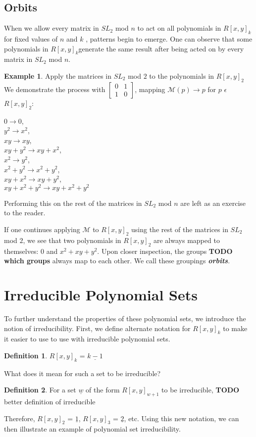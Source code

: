 \documentclass[a4paper,draft]{amsproc}
\theoremstyle{plain}
\theoremstyle{definition}
\newtheorem{exm}{Example}[section]
\newtheorem{dfn}{Definition}[section]
\theoremstyle{remark}
\numberwithin{equation}{section}
\begin{document}
\subsection{Orbits}
When we allow every matrix in $SL_{2}$ mod $n$ to act on all polynomials in $R[x,y]_{k}$for fixed values of $n$ and $k$ , patterns begin to emerge.
One can observe that some polynomials in $R[x,y]_{k}$generate the same result after being acted on by every matrix in $SL_{2}$ mod $n$. 
\begin{exm}
Apply the matrices in $SL_{2}$ mod $2$ to the polynomials in $R[x,y]_{2}$ 
We demonstrate the process with $\begin{bmatrix}
 0&1 \\ 
 1&0 
\end{bmatrix} $, mapping $\mathcal{M}(p) \rightarrow p$ for $p$ $\epsilon$ $R[x,y]_{2}$: \\

\begin{center}
$0 \rightarrow 0$, \\
$y^{2} \rightarrow x^{2}$, \\
$xy \rightarrow xy$, \\
$xy + y^{2} \rightarrow xy + x^{2}$, \\
$x^{2} \rightarrow y^{2}$, \\
$x^{2} + y^{2} \rightarrow x^{2} + y^{2}$, \\
$xy + x^{2} \rightarrow xy + y^{2}$, \\
$xy + x^{2} + y^{2} \rightarrow xy + x^{2} + y^{2}$
\end{center}

Performing this on the rest of the matrices in $SL_{2}$ mod $n$ are left as an exercise to the reader.

\end{exm}

If one continues applying $\mathcal{M}$ to $R[x,y]_{2}$ using the rest of the matrices in $SL_{2}$ mod $2$, we see that two polynomials in $R[x,y]_{2}$ are always mapped to themselves: 0 and $x^{2} + xy + y^{2}$. Upon closer inspection, the groups \textbf{TODO which groups} always map to each other. We call these groupings \textit{\textbf{orbits}}. 

\section{Irreducible Polynomial Sets}
To further understand the properties of these polynomial sets, we introduce the notion of irreducibility. 
First, we define alternate notation for $R[x,y]_{k}$ to make it easier to use to use with irreducible polynomial sets. 
\begin{dfn}
$R[x,y]_{k}$ = $\underline{k-1}$
\end{dfn} 
What does it mean for such a set to be irreducible? 
\begin{dfn}
For a set  $\underline{w}$ of the form $R[x,y]_{w+1}$ to be irreducible, \textbf{TODO} better definition of irreducible
\end{dfn} 
Therefore, $R[x,y]_{2}$ = $\underline{1}$, $R[x,y]_{3}$ = $\underline{2}$, etc. Using this new notation, we can then illustrate an example of polynomial set irreducibility. 
\end{document}
